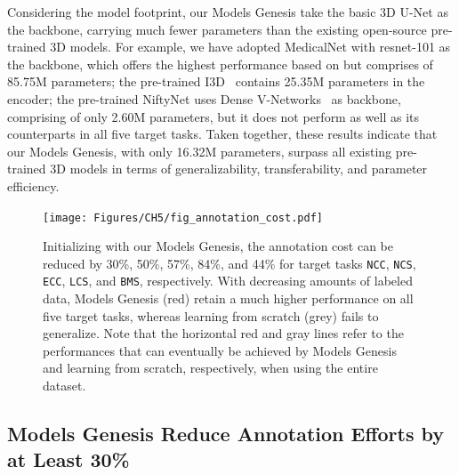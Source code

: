 Considering the model footprint, our Models Genesis take the basic 3D U-Net as the backbone, carrying much fewer parameters than the existing open-source pre-trained 3D models. For example, we have adopted MedicalNet with resnet-101 as the backbone, which offers the highest performance based on \citet{chen2019med3d} but comprises of 85.75M parameters; the pre-trained I3D~\citep{carreira2017quo} contains 25.35M parameters in the encoder; the pre-trained NiftyNet uses Dense V-Networks~\citep{gibson2018automatic} as backbone, comprising of only 2.60M parameters, but it does not perform as well as its counterparts in all five target tasks. Taken together, these results indicate that our Models Genesis, with only 16.32M parameters, surpass all existing pre-trained 3D models in terms of generalizability, transferability, and parameter efficiency.



\begin{figure}
\begin{center}
\texttt{[image: Figures/CH5/fig\_annotation\_cost.pdf]}
\caption[Models Genesis Reduce Annotation Efforts by at Least 30\%]{
Initializing with our Models Genesis, the annotation cost can be reduced by 30\%, 50\%, 57\%, 84\%, and 44\% for target tasks \texttt{NCC}, \texttt{NCS}, \texttt{ECC}, \texttt{LCS}, and \texttt{BMS}, respectively. With decreasing amounts of labeled data, Models Genesis (red) retain a much higher performance on all five target tasks, whereas learning from scratch (grey) fails to generalize. Note that the horizontal red and gray lines refer to the performances that can eventually be achieved by Models Genesis and learning from scratch, respectively, when using the entire dataset.
}
\label{ch5:fig:annotation_cost}
\end{center}
\end{figure}



\subsection{Models Genesis Reduce Annotation Efforts by at Least 30\%}
\label{ch5:annotation_effort}

